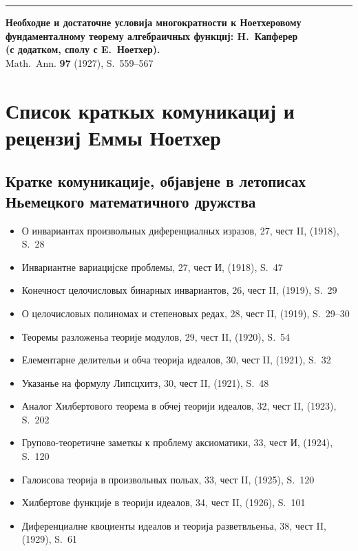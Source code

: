 \documentclass[11pt]{article}
\newcommand{\foreign}[1]{#1}
\begin{document}
\vspace{1em}
\noindent\rule{\textwidth}{0.4pt}
\vspace{0.5em}

\noindent\textbf{Необходне и достаточне условија многократности к Ноетхеровому}\\
\textbf{фундаменталному теорему алгебраичных функциј: H.\ Капферер}\\
\textbf{(с додатком, сполу с E.\ Ноетхер).}\\
\foreign{Math.\ Ann.} \textbf{97} (1927), S.~559--567

\newpage
\section*{Список краткых комуникациј и рецензиј Еммы Ноетхер}

\subsection*{Кратке комуникације, објавјене в летописах Ньемецкого математичного дружства}

\begin{itemize}[leftmargin=1.5em,itemsep=0.2em]
\item О инвариантах произвольных диференциалных изразов, 27, чест II, (1918), S.~28
\item Инвариантне вариацијске проблемы, 27, чест И, (1918), S.~47
\item Конечност целочисловых бинарных инвариантов, 26, чест II, (1919), S.~29
\item О целочисловых полиномах и степеновых редах, 28, чест II, (1919), S.~29--30
\item Теоремы разложеньа теорије модулов, 29, чест II, (1920), S.~54
\item Елементарне делительи и обча теорија идеалов, 30, чест II, (1921), S.~32
\item Указанье на формулу Липсцхитз, 30, чест II, (1921), S.~48
\item Аналог Хилбертового теорема в обчеј теорији идеалов, 32, чест II, (1923), S.~202
\item Групово-теоретичне заметкы к проблему аксиоматики, 33, чест И, (1924), S.~120
\item Галоисова теорија в произвольных польах, 33, чест II, (1925), S.~120
\item Хилбертове функције в теорији идеалов, 34, чест II, (1926), S.~101
\item Диференциалне квоциенты идеалов и теорија разветвльеньа, 38, чест II, (1929), S.~61
\end{itemize}
\end{document}
